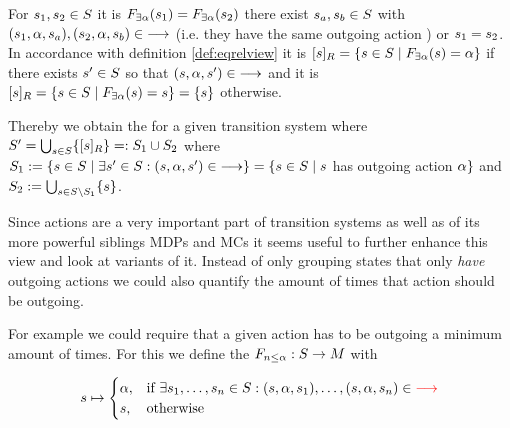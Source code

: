 \documentclass[preview]{standalone}
\begin{document}
For ${s}_1,{s}_2 \in {S}$ it is ${{{{F}}_{\exists\alpha}}}({s}_1) = {{{{F}}_{\exists\alpha}}}({s}_2)$ \iffN 
there exist ${s}_{a},{s}_{b} \in {S}$ with 
$({s}_1, {\alpha}, {s}_{a}), ({s}_2, {\alpha}, {s}_{b}) \in {\longrightarrow}$ (i.e. they have the same outgoing action \action) or ${s}_1 = {s}_2$. 
In accordance with definition \ref{def:eqrelview} it is 
$\eqclassv{\state} = \{\state \in \states \mid \gfcthasoutaction(\state) = \action\}$ if 
there exists ${s}' \in {S}$ so that $({s}, {\alpha}, {s}') \in {\longrightarrow}$ and it is
$\eqclassv{\state} = \{\state \in \states \mid \gfcthasoutaction(\state) = \state\} = \{s\}$ otherwise. %

Thereby we obtain the \viewN \viewhasoutaction for a given transition system \ts where ${S}' = \bigcup_{{s} \in {S}} \{{{[{s}]_{{R}}}}\} =: {S}_1 \cup {S}_2$ where ${S}_1 := \{{s} \in {S} \mid \exists {s}' \in {S}: ({s}, {\alpha}, {s}') \in {\longrightarrow}\} = \{{s} \in {S} \mid {s}$ has outgoing action ${\alpha}\}$ and ${S}_2 := \bigcup_{{s} \in {S} \setminus {S}_1}\{{s}\}$.

Since actions are a very important part of transition systems as well as of its more powerful siblings MDPs and MCs it seems useful to further enhance this view and look at variants of it. Instead of only grouping states that only \emph{have} outgoing actions we could also quantify the amount of times that action should be outgoing.

For example we could require that a given action has to be outgoing a minimum amount of times. For this we define the \grpfctN ${{{{F}}_{{n}\leq\alpha}}} : {S} \to {M}$ with

\[
{s} \mapsto
\begin{cases}
	{\alpha},				& \text{if } \exists {s}_1, \dots, {s}_{n} \in {S}: ({s}, {\alpha}, {s}_1), \dots, ({s}, {\alpha}, {s}_{n}) \in {\color{red}\ensuremath{{\longrightarrow}}} \\
	{s},          	& \text{otherwise}
\end{cases}
\]
 
\end{document}
